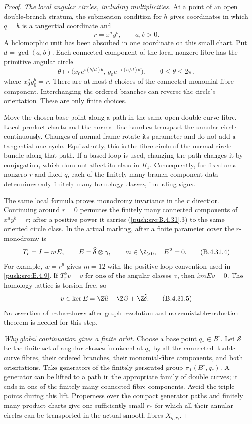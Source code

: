 \begin{proof}
\emph{The local angular circles, including multiplicities.}
At a point of an open double-branch stratum, the submersion
condition for $h$ gives coordinates in which $q=h$ is a
tangential coordinate and
\[
                 r=x^a y^b,\qquad a,b>0.
 \tag{B.4.31.2}
\]
A holomorphic unit has been absorbed in one coordinate on this
small chart. Put $d=\gcd(a,b)$. Each connected component of the
local nonzero fibre has the primitive angular circle
\[
 \theta\longmapsto
 \bigl(x_0e^{i(b/d)\theta},\,
       y_0e^{-i(a/d)\theta}\bigr),
       \qquad 0\le\theta\le2\pi,
 \tag{B.4.31.3}
\]
where $x_0^a y_0^b=r$. There are at most $d$ choices of the
connected monomial-fibre component. Interchanging the ordered
branches can reverse the circle's orientation. These are only
finite choices.

Move the chosen base point along a path in the same open
double-curve fibre. Local product charts and the normal line
bundles transport the annular circle continuously. Changes of
normal frame rotate its parameter and do not add a tangential
one-cycle. Equivalently, this is the fibre circle of the normal
circle bundle along that path. If a based loop is used, changing
the path changes it by conjugation, which does not affect its
class in $H_1$. Consequently, for fixed small nonzero $r$ and
fixed $q$, each of the finitely many branch-component data
determines only finitely many homology classes, including signs.

The same local formula proves monodromy invariance in the
$r$ direction. Continuing around $r=0$ permutes the finitely
many connected components of $x^a y^b=r$; after a positive
power it carries (\ref{push:src:B.4.31}.3) to the same oriented circle class.
In the actual marking, after a finite parameter cover the
$r$-monodromy is
\[
 T_r=I-mE,\qquad
 E=\widehat\delta\otimes\gamma,\qquad m\in\Z_{>0},
 \quad E^2=0.
 \tag{B.4.31.4}
\]
For example, $w=r^6$ gives $m=12$ with the positive-loop
convention used in \ref{push:src:B.4.9}. If $T_r^k v=v$ for one of the
angular classes $v$, then $kmEv=0$. The homology lattice is
torsion-free, so
\[
 v\in\ker E
    =\Z\widehat u+\Z\widehat w+\Z\widehat\delta.
 \tag{B.4.31.5}
\]
No assertion of reducedness after graph resolution and no
semistable-reduction theorem is needed for this step.

\emph{Why global continuation gives a finite orbit.}
Choose a base point $q_*\in B^\circ$. Let $\mathscr S$ be the
finite set of angular classes furnished at $q_*$ by all the
connected double-curve fibres, their ordered branches, their
monomial-fibre components, and both orientations.
Take generators of the finitely generated group
$\pi_1(B^\circ,q_*)$. A generator can be lifted to a path in
the appropriate family of double curves; it ends in one of
the finitely many connected fibre components. Avoid the
triple points during this lift. Properness over the compact
generator paths and finitely many product charts give one
sufficiently small $r_*$ for which all their annular circles
can be transported in the actual smooth fibres
$X_{q,r_*}$.


\end{proof}
